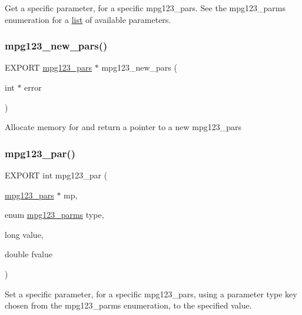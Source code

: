 Get a specific parameter, for a specific mpg123\+\_\+pars. See the mpg123\+\_\+parms enumeration for a \hyperlink{protocollist-p}{list} of available parameters. \mbox{\label{group__mpg123__advpar_ga4ca3810b635b11e97aa3253d97029948}} 
\subsubsection{\texorpdfstring{mpg123\+\_\+new\+\_\+pars()}{mpg123\_new\_pars()}}
{\footnotesize\ttfamily E\+X\+P\+O\+RT \hyperlink{group__mpg123__advpar_ga3983578625af3bb6dc7e3b74d0cab4aa}{mpg123\+\_\+pars} $\ast$ mpg123\+\_\+new\+\_\+pars (\begin{DoxyParamCaption}\item[{int $\ast$}]{error }\end{DoxyParamCaption})}

Allocate memory for and return a pointer to a new mpg123\+\_\+pars \mbox{\label{group__mpg123__advpar_ga1264032012d421572198dda37ed88bd2}} 
\subsubsection{\texorpdfstring{mpg123\+\_\+par()}{mpg123\_par()}}
{\footnotesize\ttfamily E\+X\+P\+O\+RT int mpg123\+\_\+par (\begin{DoxyParamCaption}\item[{\hyperlink{group__mpg123__advpar_ga3983578625af3bb6dc7e3b74d0cab4aa}{mpg123\+\_\+pars} $\ast$}]{mp,  }\item[{enum \hyperlink{group__mpg123__init_ga73a8ff3363028b89afc72b3ea032b9cb}{mpg123\+\_\+parms}}]{type,  }\item[{long}]{value,  }\item[{double}]{fvalue }\end{DoxyParamCaption})}

Set a specific parameter, for a specific mpg123\+\_\+pars, using a parameter type key chosen from the mpg123\+\_\+parms enumeration, to the specified value. \mbox{\label{group__mpg123__advpar_gac821d9eb625a70c1d30a3a14a211f2d2}} 
